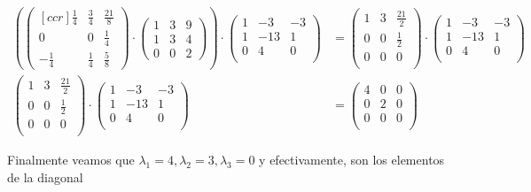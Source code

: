 \documentclass[letterpaper]{article}
\renewcommand{\*}{\cdot}
\newcommand{\T}{\begin{pmatrix}
		1 & 3 & 9 \\
		1 & 3 & 4 \\
		0 & 0 & 2 
\end{pmatrix} }
\theoremstyle{definition}
\begin{document}
\begin{align*}
	\left( \begin{pmatrix}[ccr]
	\frac{1}{4} &\frac{3}{4} & \frac{21}{8} \\
	0 & 0 & \frac{1}{4}\\
	-\frac{1}{4} & \frac{1}{4} & \frac{5}{8}
	\end{pmatrix} \* \T \right) \* \begin{pmatrix}
	1 & -3 & -3\\
	1 & -13 & 1\\
	0 & 4 & 0\\
	\end{pmatrix} &= \begin{pmatrix}
	1 & 3 & \frac{21}{2}\\
	0 & 0 & \frac{1}{2}\\
	0 & 0 & 0\\
	\end{pmatrix} \* \begin{pmatrix}
	1 & -3 & -3\\
	1 & -13 & 1\\
	0 & 4 & 0\\
	\end{pmatrix} \\
	\begin{pmatrix}
	1 & 3 & \frac{21}{2}\\
	0 & 0 & \frac{1}{2}\\
	0 & 0 & 0\\
	\end{pmatrix} \* \begin{pmatrix}
	1 & -3 & -3\\
	1 & -13 & 1\\
	0 & 4 & 0\\
	\end{pmatrix} & = \begin{pmatrix}
	4 & 0 & 0\\
	0 & 2 & 0\\
	0 & 0 & 0\\
	\end{pmatrix}
\end{align*}

\begin{center}
Finalmente veamos que $ \lambda_1 = 4, \lambda_2 = 3, \lambda_3 = 0 $ y efectivamente, son los elementos de la diagonal
\end{center}
\end{document}
